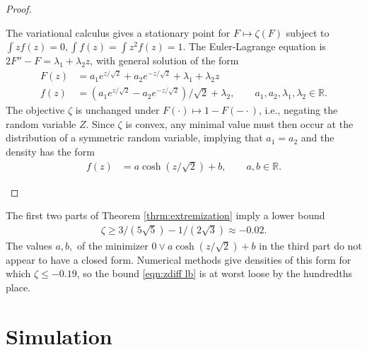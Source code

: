 \documentclass[12pt]{article}
\newcommand{\z}{Z}
\newcommand{\zdiff}{\zeta}
\newcommand{\comment}[1]{
  \iftoggle{commenttoggle}{
    {\normalsize{\color{red}{ #1}}\normalsize}
  }
  {}
}
\begin{document}
\begin{proof}
\begin{enumerate}
    The variational calculus gives a stationary point for $F\mapsto\zdiff(F)$ subject to $\int z f(z)=0,\int f(z)=\int z^2 f(z)=1$. The %
    Euler-Lagrange equation is $2F''-F=\lambda_1+\lambda_2z$, with general solution of the form
    \begin{align}
      F(z)&=a_1e^{z/\sqrt{2}}+a_2e^{-z/\sqrt{2}}+\lambda_1+\lambda_2z\\
      f(z)&=(a_1e^{z/\sqrt{2}}-a_2e^{-z/\sqrt{2}})/\sqrt{2}+\lambda_2, \qquad a_1,a_2,\lambda_1,\lambda_2\in\mathbb{R}.
    \end{align}
    The objective $\zdiff$ is unchanged under
    $F(\cdot)\mapsto 1-F(-\cdot)$, i.e., negating the random variable
    $\z$. Since $\zdiff$ is convex, any minimal value must then occur at the
    distribution of a symmetric random variable, implying that
    $a_1=a_2$ and the density has the form
    \begin{align}
      f(z)&= a \cosh(z/\sqrt{2})+b,\qquad a,b\in\mathbb{R}.
    \end{align}    
  \end{enumerate}
\end{proof}
The first two parts of Theorem \ref{thrm:extremization} imply a lower bound
\begin{align}
\zdiff \ge 3/(5\sqrt{5})-1/(2\sqrt{3})\approx -0.02.\label{eqn:zdiff lb}
\end{align}
The values $a,b,$ of the minimizer
$0\vee a\cosh(z/\sqrt{2})+b$ in the third part do not appear to have
a closed form. Numerical methods give densities of this form for which
$\zdiff\le -0.19$, so the bound \eqref{eqn:zdiff lb} is at worst loose by the
hundredths place.





\section{Simulation}\label{sec:simulation}
\end{document}

